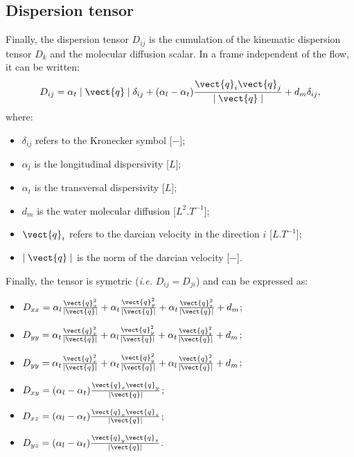 \subsection{Dispersion tensor}
Finally, the dispersion tensor $D_{ij}$ is the cumulation of the kinematic dispersion tensor $D_k$ and the molecular diffusion scalar.
In a frame independent of the flow, it can be written:
\begin{equation}\label{eq:groundwater:formul_disp}
 D_{ij}= \alpha_t \mid \vect{q} \mid \delta_{ij} + (\alpha_l - \alpha_t) \frac{\vect{q}_i \vect{q}_j}{\mid \vect{q} \mid} + d_m \delta_{ij},
\end{equation}
where:
\begin{itemize}
 \item[$\bullet$] $\delta_{ij}$ refers to the Kronecker symbol [$-$];
 \item[$\bullet$] $\alpha_l$ is the longitudinal dispersivity [$L$];
 \item[$\bullet$] $\alpha_t$ is the transversal dispersivity [$L$];
 \item[$\bullet$] $d_m$ is the water molecular diffusion [$L^2.T^{-1}$];
 \item[$\bullet$] $\vect{q}_i$ refers to the darcian velocity in the direction $i$ [$L.T^{-1}$];
 \item[$\bullet$] $\mid \vect{q} \mid$ is the norm of the darcian velocity [$-$].
\end{itemize}
Finally, the tensor is symetric (\emph{i.e.} $D_{ij}=D_{ji}$) and can be expressed as:
\begin{itemize}
 \item[$\bullet$] $D_{xx}=\alpha_l\frac{\vect{q}_x^2}{\mid \vect{q} \mid}+\alpha_t\frac{\vect{q}_y^2}{\mid \vect{q} \mid}+\alpha_t \frac{\vect{q}_z^2}{\mid \vect{q} \mid}+d_m$;
 \item[$\bullet$] $D_{yy}=\alpha_t\frac{\vect{q}_x^2}{\mid \vect{q} \mid}+\alpha_l\frac{\vect{q}_y^2}{\mid \vect{q} \mid}+\alpha_t \frac{\vect{q}_z^2}{\mid \vect{q} \mid}+d_m$;
 \item[$\bullet$] $D_{yy}=\alpha_t\frac{\vect{q}_x^2}{\mid \vect{q} \mid}+\alpha_t\frac{\vect{q}_y^2}{\mid \vect{q} \mid}+\alpha_l \frac{\vect{q}_z^2}{\mid \vect{q} \mid}+d_m$;
 \item[$\bullet$] $D_{xy}=(\alpha_l - \alpha_t) \frac{\vect{q}_x \vect{q}_y}{\mid \vect{q} \mid}$;
 \item[$\bullet$] $D_{xz}=(\alpha_l - \alpha_t) \frac{\vect{q}_x \vect{q}_z}{\mid \vect{q} \mid}$;
 \item[$\bullet$] $D_{yz}=(\alpha_l - \alpha_t) \frac{\vect{q}_y \vect{q}_z}{\mid \vect{q} \mid}$.
\end{itemize}

